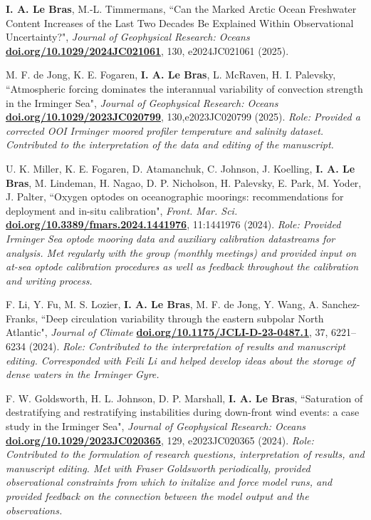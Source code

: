 \documentclass[paper=letter,fontsize=11pt]{scrartcl} %
\newcommand{\PaperEntry}[6]{
		\noindent #1, ``#2", \textit{#3} \textbf{#4}, #5 (#6).}
\begin{document}
\begin{etaremune}

\item \PaperEntry{\textbf{I. A. Le Bras}, M.-L. Timmermans}{Can the Marked Arctic Ocean Freshwater Content Increases of the Last Two Decades Be Explained Within Observational Uncertainty?}{Journal of Geophysical Research: Oceans}{\url{doi.org/10.1029/2024JC021061}}{130, e2024JC021061}{2025}

\item \PaperEntry{M. F. de Jong, K. E. Fogaren, \textbf{I. A. Le Bras}, L. McRaven, H. I. Palevsky}{Atmospheric forcing dominates the interannual variability of convection strength in the Irminger Sea}{Journal of Geophysical Research: Oceans}{\url{doi.org/10.1029/2023JC020799}}{130,e2023JC020799}{2025}
\emph{Role: Provided a corrected OOI Irminger moored profiler temperature and salinity dataset. Contributed to the interpretation of the data and editing of the manuscript.}\\

\item \PaperEntry{U. K. Miller, K. E. Fogaren, D. Atamanchuk, C. Johnson, J. Koelling, \textbf{I. A. Le Bras}, M. Lindeman, H. Nagao, D. P. Nicholson, H. Palevsky, E. Park, M. Yoder, J. Palter}{Oxygen optodes on oceanographic moorings: recommendations for deployment and in-situ calibration}{Front. Mar. Sci.}{\url{doi.org/10.3389/fmars.2024.1441976}}{11:1441976}{2024}
\emph{Role: Provided Irminger Sea optode mooring data and auxiliary calibration datastreams for analysis. Met regularly with the group (monthly meetings) and provided input on at-sea optode calibration procedures as well as feedback throughout the calibration and writing process.}\\

\item \PaperEntry{F. Li, Y. Fu, M. S. Lozier, \textbf{I. A. Le Bras}, M. F. de Jong, Y. Wang, A. Sanchez-Franks}{Deep circulation variability through the eastern subpolar North Atlantic}{Journal of Climate}{\url{doi.org/10.1175/JCLI-D-23-0487.1}}{37, 6221–6234}{2024} 
\emph{Role: Contributed to the interpretation of results and manuscript editing. Corresponded with Feili Li and helped develop ideas about the storage of dense waters in the Irminger Gyre.}\\

\item \PaperEntry{F. W. Goldsworth, H. L. Johnson, D. P. Marshall, \textbf{I. A. Le Bras}}{Saturation of destratifying and restratifying instabilities during down-front wind events: a case study in the Irminger Sea}{Journal of Geophysical Research: Oceans}{\url{doi.org/10.1029/2023JC020365}}{129, e2023JC020365}{2024} \emph{Role: Contributed to the formulation of research questions, interpretation of results, and manuscript editing. Met with Fraser Goldsworth periodically, provided observational constraints from which to initalize and force model runs, and provided feedback on the connection between the model output and the observations. }


\end{etaremune}
\end{document}
